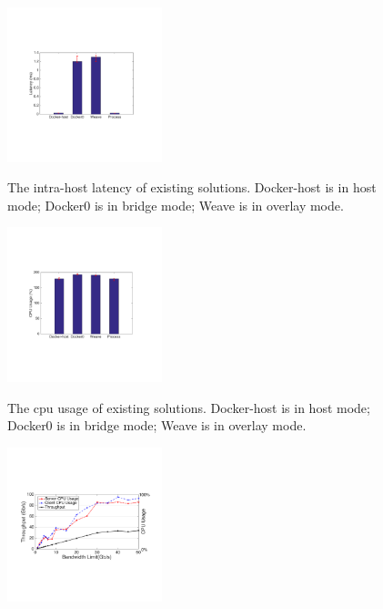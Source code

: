 \begin{figure}[ht]
     \centering 
     \includegraphics[width=0.4\textwidth]{figures/motivation/eval_exist_latency.pdf} 
     \label{fig:eval_exist_latency}
     \caption{The intra-host latency of existing solutions. Docker-host is in host mode; Docker0 is in bridge mode; Weave is in overlay mode.} 
\end{figure} 

\begin{figure}[ht]
     \centering 
     \includegraphics[width=0.4\textwidth]{figures/motivation/eval_exist_cpu.pdf} 
     \label{fig:eval_exist_cpu}
     \caption{The cpu usage of existing solutions. Docker-host is in host mode; Docker0 is in bridge mode; Weave is in overlay mode.} 
\end{figure} 

\begin{figure}[ht]
     \centering 
     \includegraphics[width=0.4\textwidth]{figures/motivation/eval_bw_cpu.pdf}      
     \label{fig:eval_bw_cpu}
     \caption{} 
\end{figure}


